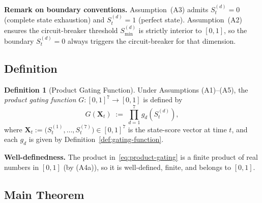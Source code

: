 \documentclass[12pt,openany]{book}
\numberwithin{equation}{chapter}
\theoremstyle{plain}
\theoremstyle{definition}
\newtheorem{definition}[theorem]{Definition}
\theoremstyle{remark}
\def\mathcal#1{#1}%
\begin{document}
\noindent
\textbf{Remark on boundary conventions.}
Assumption~(A3) admits $\mathcal{S}_t^{(d)} = 0$ (complete
state exhaustion) and $\mathcal{S}_t^{(d)} = 1$ (perfect
state).  Assumption~(A2) ensures the circuit-breaker
threshold $\mathcal{S}_{\min}^{(d)}$ is strictly interior to
$[0,1]$, so the boundary $\mathcal{S}_t^{(d)} = 0$ always
triggers the circuit-breaker for that dimension.

\subsection{Definition}

\begin{definition}[Product Gating Function]
\label{def:product-gating}
Under Assumptions (A1)--(A5), the
\emph{product gating function}
$G : [0,1]^{7} \to [0,1]$ is defined by
\begin{equation}
  G\!\left(\mathbf{X}_t\right)
  \;:=\;
  \prod_{d=1}^{7}
    g_d\!\left(\mathcal{S}_t^{(d)}\right),
  \label{eq:product-gating}
\end{equation}
where $\mathbf{X}_t :=
\bigl(\mathcal{S}_t^{(1)},\ldots,\mathcal{S}_t^{(7)}\bigr)
\in [0,1]^{7}$ is the state-score vector at time $t$, and
each $g_d$ is given by Definition~\ref{def:gating-function}.
\end{definition}

\noindent
\textbf{Well-definedness.}
The product in~\eqref{eq:product-gating} is a finite product
of real numbers in $[0,1]$ (by (A4a)), so it is well-defined,
finite, and belongs to $[0,1]$.

\subsection{Main Theorem}
\end{document}
